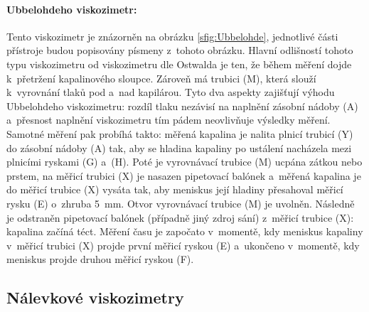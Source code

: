 \documentclass[12pt]{article}
\begin{document}
\paragraph{Ubbelohdeho viskozimetr:} Tento viskozimetr je znázorněn na obrázku \ref{sfig:Ubbelohde}, jednotlivé části přístroje budou popisovány písmeny z~tohoto obrázku. Hlavní odlišností tohoto typu viskozimetru od viskozimetru dle Ostwalda je ten, že během měření dojde k~přetržení kapalinového sloupce. Zároveň má trubici (M), která slouží k~vyrovnání tlaků pod a~nad kapilárou. Tyto dva aspekty zajišťují výhodu Ubbelohdeho viskozimetru: rozdíl tlaku nezávisí na naplnění zásobní nádoby (A) a~přesnost naplnění viskozimetru tím pádem neovlivňuje výsledky měření.~\cite{wiki:Ubbelohde_viscometer} Samotné měření pak probíhá takto: měřená kapalina je nalita plnicí trubicí (Y) do zásobní nádoby (A) tak, aby se hladina kapaliny po ustálení nacházela mezi plnicími ryskami (G) a~(H). Poté je vyrovnávací trubice (M) ucpána zátkou nebo prstem, na měřicí trubici (X) je nasazen pipetovací balónek a~měřená kapalina je do měřicí trubice (X) vysáta tak, aby meniskus její hladiny přesahoval měřicí rysku (E) o~zhruba \SI{5}{\milli\metre}. Otvor vyrovnávací trubice (M) je uvolněn. Následně je odstraněn pipetovací balónek (případně jiný zdroj sání) z~měřicí trubice (X): kapalina začíná téct. Měření času je započato v~momentě, kdy meniskus kapaliny v~měřicí trubici (X) projde první měřicí ryskou (E) a~ukončeno v~momentě, kdy meniskus projde druhou měřicí ryskou (F).~\cite{book:Calibration_of_viscometers}

\subsection{Nálevkové viskozimetry}%
\end{document}

